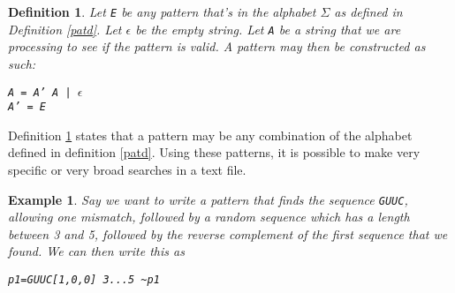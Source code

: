 \documentclass[11pt,twoside,a4paper]{article}
\newtheorem{definition}{Definition}
\newtheorem{example}{Example}
\begin{document}
\begin{definition}\label{patc}
Let {\tt E} be any pattern that's in the alphabet $\Sigma$ as defined in Definition \ref{patd}. 
Let $\epsilon$ be the empty string.
Let {\tt A} be a string that we are processing to see if the pattern is valid.
A pattern may then be constructed as such: \begin{center}
{\tt A = A' A | $\epsilon$}\\
{\tt A' = E}\end{center}
\end{definition}
Definition \ref{patc} states that a pattern may be any combination of the alphabet 
defined in definition \ref{patd}.
Using these patterns, it is possible to make very specific or very broad 
searches in a text file. 

\begin{example}
Say we want to write a pattern that finds the sequence {\tt GUUC}, allowing 
one mismatch, followed by a random sequence which has a length between 3 and 5, 
followed by the reverse complement of the first sequence that we found. We can 
then write this as \begin{center}
{\tt p1=GUUC[1,0,0] 3...5 \textasciitilde p1}
\end{center}
\end{example}
\end{document}
